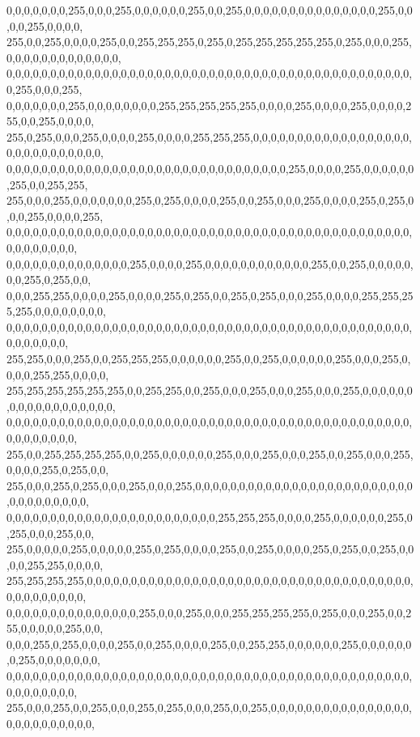 \begin{DoxyCode}
      0,0,0,0,0,0,0,255,0,0,0,255,0,0,0,0,0,0,255,0,0,255,0,0,0,0,0,0,0,0,0,0,0,0,0,0,0,255,0,0,0,0,255,0,0,0,0,
      255,0,0,255,0,0,0,0,255,0,0,255,255,255,0,255,0,255,255,255,255,255,0,255,0,0,0,255,0,0,0,0,0,0,0,0,0,0,0,0,0,
      0,0,0,0,0,0,0,0,0,0,0,0,0,0,0,0,0,0,0,0,0,0,0,0,0,0,0,0,0,0,0,0,0,0,0,0,0,0,0,0,0,0,0,0,0,0,0,255,0,0,0,255,
      0,0,0,0,0,0,0,255,0,0,0,0,0,0,0,0,255,255,255,255,255,0,0,0,0,255,0,0,0,0,255,0,0,0,0,255,0,0,255,0,0,0,0,
      255,0,255,0,0,0,255,0,0,0,0,255,0,0,0,0,255,255,255,0,0,0,0,0,0,0,0,0,0,0,0,0,0,0,0,0,0,0,0,0,0,0,0,0,0,0,0,0,
      0,0,0,0,0,0,0,0,0,0,0,0,0,0,0,0,0,0,0,0,0,0,0,0,0,0,0,0,0,0,0,0,255,0,0,0,0,255,0,0,0,0,0,0,255,0,0,255,255,
      255,0,0,0,255,0,0,0,0,0,0,0,255,0,255,0,0,0,0,255,0,0,255,0,0,0,255,0,0,0,0,255,0,255,0,0,0,255,0,0,0,0,255,
      0,0,0,0,0,0,0,0,0,0,0,0,0,0,0,0,0,0,0,0,0,0,0,0,0,0,0,0,0,0,0,0,0,0,0,0,0,0,0,0,0,0,0,0,0,0,0,0,0,0,0,0,0,0,
      0,0,0,0,0,0,0,0,0,0,0,0,0,0,255,0,0,0,0,255,0,0,0,0,0,0,0,0,0,0,0,0,255,0,0,255,0,0,0,0,0,0,0,255,0,255,0,0,
      0,0,0,255,255,0,0,0,0,255,0,0,0,0,255,0,255,0,0,255,0,255,0,0,0,255,0,0,0,0,255,255,255,255,0,0,0,0,0,0,0,0,
      0,0,0,0,0,0,0,0,0,0,0,0,0,0,0,0,0,0,0,0,0,0,0,0,0,0,0,0,0,0,0,0,0,0,0,0,0,0,0,0,0,0,0,0,0,0,0,0,0,0,0,0,0,
      255,255,0,0,0,255,0,0,255,255,255,0,0,0,0,0,0,255,0,0,255,0,0,0,0,0,0,255,0,0,0,255,0,0,0,0,255,255,0,0,0,0,
      255,255,255,255,255,255,0,0,255,255,0,0,255,0,0,0,255,0,0,0,255,0,0,0,255,0,0,0,0,0,0,0,0,0,0,0,0,0,0,0,0,0,0,
      0,0,0,0,0,0,0,0,0,0,0,0,0,0,0,0,0,0,0,0,0,0,0,0,0,0,0,0,0,0,0,0,0,0,0,0,0,0,0,0,0,0,0,0,0,0,0,0,0,0,0,0,0,0,
      255,0,0,255,255,255,255,0,0,255,0,0,0,0,0,0,255,0,0,0,255,0,0,0,255,0,0,255,0,0,0,255,0,0,0,0,255,0,255,0,0,
      255,0,0,0,255,0,255,0,0,0,255,0,0,0,255,0,0,0,0,0,0,0,0,0,0,0,0,0,0,0,0,0,0,0,0,0,0,0,0,0,0,0,0,0,0,0,0,0,0,
      0,0,0,0,0,0,0,0,0,0,0,0,0,0,0,0,0,0,0,0,0,0,0,0,255,255,255,0,0,0,0,255,0,0,0,0,0,0,255,0,255,0,0,0,255,0,0,
      255,0,0,0,0,0,255,0,0,0,0,0,255,0,255,0,0,0,0,255,0,0,255,0,0,0,0,255,0,255,0,0,255,0,0,0,0,255,255,0,0,0,0,
      255,255,255,255,0,0,0,0,0,0,0,0,0,0,0,0,0,0,0,0,0,0,0,0,0,0,0,0,0,0,0,0,0,0,0,0,0,0,0,0,0,0,0,0,0,0,0,0,0,0,
      0,0,0,0,0,0,0,0,0,0,0,0,0,0,0,255,0,0,0,255,0,0,0,255,255,255,255,0,255,0,0,0,255,0,0,255,0,0,0,0,0,255,0,0,
      0,0,0,255,0,255,0,0,0,0,255,0,0,255,0,0,0,0,255,0,0,255,255,0,0,0,0,0,0,255,0,0,0,0,0,0,0,255,0,0,0,0,0,0,0,
      0,0,0,0,0,0,0,0,0,0,0,0,0,0,0,0,0,0,0,0,0,0,0,0,0,0,0,0,0,0,0,0,0,0,0,0,0,0,0,0,0,0,0,0,0,0,0,0,0,0,0,0,0,0,
      255,0,0,0,255,0,0,255,0,0,0,255,0,255,0,0,0,255,0,0,255,0,0,0,0,0,0,0,0,0,0,0,0,0,0,0,0,0,0,0,0,0,0,0,0,0,0,

\end{DoxyCode}
